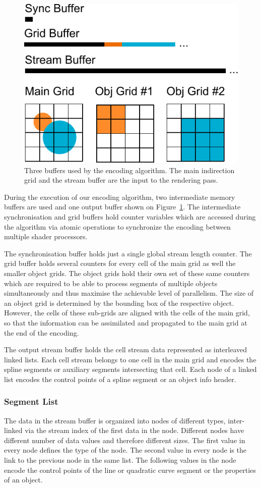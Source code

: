 \documentclass[11pt,a4paper,twoside]{article}
\begin{document}
\begin {figure}
	\centering
	\includegraphics[width=0.4\columnwidth] {figures/data_buffers}
	\caption {Three buffers used by the encoding algorithm. The main indirection grid and the stream buffer are the input to the rendering pass.}
	\label {fig:data_buffers}
\end {figure}

During the execution of our encoding algorithm, two intermediate memory buffers are used and one output buffer shown on Figure~\ref{fig:data_buffers}. The intermediate synchronisation and grid buffers hold counter variables which are accessed during the algorithm via atomic operations to synchronize the encoding between multiple shader processors.

The synchronisation buffer holds just a single global stream length counter. The grid buffer holds several counters for every cell of the main grid as well the smaller object grids. The object grids hold their own set of these same counters which are required to be able to process segments of multiple objects simultaneously and thus maximise the achievable level of parallelism. The size of an object grid is determined by the bounding box of the respective object. However, the cells of these sub-grids are aligned with the cells of the main grid, so that the information can be assimilated and propagated to the main grid at the end of the encoding.

The output stream buffer holds the cell stream data represented as interleaved linked lists. Each cell stream belongs to one cell in the main grid and encodes the spline segments or auxiliary segments intersecting that cell. Each node of a linked list encodes the control points of a spline segment or an object info header.

\subsubsection {Segment List}

The data in the stream buffer is organized into nodes of different types, inter-linked via the stream index of the first data in the node. Different nodes have different number of data values and therefore different sizes. The first value in every node defines the type of the node. The second value in every node is the link to the previous node in the same list. The following values in the node encode the control points of the line or quadratic curve segment or the properties of an object.
\end{document}
